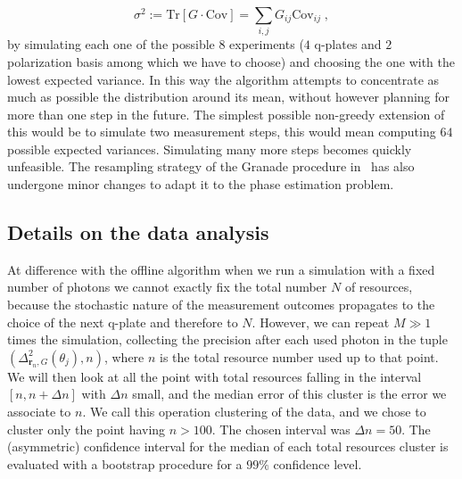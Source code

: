 \documentclass[superscriptaddress,notitlepage,pra]{revtex4-1}
\begin{document}
%
\begin{equation}
	\sigma^2 := \text{Tr} \left[ G \cdot \text{Cov} \right] = \sum_{i, j} G_{ij} \text{Cov}_{ij} \; ,
\end{equation}
%
by simulating each one of the possible $8$ experiments ($4$ q-plates and $2$ polarization basis among which we have to choose) and choosing the one with the lowest expected variance. In this way the algorithm attempts to concentrate as much as possible the distribution around its mean, without however planning for more than one step in the future. The simplest possible non-greedy extension of this would be to simulate two measurement steps, this would mean computing $64$ possible expected variances. Simulating many more steps becomes quickly unfeasible. The resampling strategy of the Granade procedure in~\cite{granade2012robust} has also undergone minor changes to adapt it to the phase estimation problem. 

\subsection*{Details on the data analysis}
\label{sec:details}
%
At difference with the offline algorithm when we run a simulation with a fixed number of photons we cannot exactly fix the total number $N$ of resources, because the stochastic nature of the measurement outcomes propagates to the choice of the next q-plate and therefore to $N$. However, we can repeat $M \gg 1$ times the simulation, collecting the precision after each used photon in the tuple $(\Delta_{{\boldsymbol{r}_n}, G}^2 (\theta_j), n)$, where $n$ is the total resource number used up to that point. We will then look at all the point with total resources falling in the interval $[n, n+\Delta n]$ with $\Delta n$ small, and the median error of this cluster is the error we associate to $n$. We call this operation clustering of the data, and we chose to cluster only the point having $n>100$. The chosen interval was $\Delta n = 50$. 
The (asymmetric) confidence interval for the median of each total resources cluster is evaluated with a bootstrap procedure for a $99\%$ confidence level. 
\end{document}
